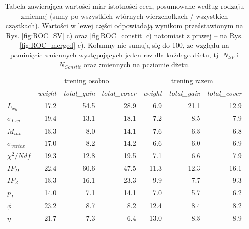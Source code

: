 \begin{table}
\centering
\begin{tabular}{l|rrr|rrr}
\toprule
{} & \multicolumn{3}{c|}{trening osobno} & \multicolumn{3}{c}{trening razem} \\
{} & \textit{weight} & \textit{total\_gain} & \textit{total\_cover} & \textit{weight} &   \textit{total\_gain} &  \textit{total\_cover} \\
\midrule
$L_{xy}$              &     17.2 &         54.5 &          28.9 &    6.9 &       21.1 &        12.9 \\
$\sigma_{Lxy}$         &     19.4 &         13.1 &          18.1 &    7.2 &        8.5 &         7.9 \\
$M_{inv}$             &     18.3 &          8.0 &          14.1 &    7.6 &        6.8 &         6.8 \\
$\sigma_{vertex}$       &     17.0 &          8.2 &          14.2 &    6.6 &        6.0 &         6.9 \\
$\chi^2/Ndf$             &     19.3 &         12.8 &          19.5 &    7.1 &        6.6 &         7.9 \\
\cline{1-4}
$IP_D$ &     22.4 &         60.6 &          47.5 &   11.3 &       12.3 &        16.1 \\
$IP_Z$ &     18.3 &         16.1 &          23.3 &    9.9 &        7.7 &         9.3 \\
$p_T$               &     14.0 &          7.1 &          14.1 &    7.0 &        5.7 &         6.2 \\
$\phi$              &     23.2 &          8.7 &           8.2 &   12.4 &        8.4 &         8.2 \\
$\eta$              &     21.7 &          7.3 &           6.4 &   13.0 &        8.8 &         8.9 \\
\bottomrule
\end{tabular}
\caption{Tabela zawierająca wartości miar istotności cech, posumowane według rodzaju zmiennej (sumy po wszystkich wtórnych wierzchołkach / wszystkich cząstkach). 
Wartości w lewej części odpowiadają wynikom przedstawionym na Rys. \ref{fig:ROC_SV} c) oraz \ref{fig:ROC_constit} c) natomiast z prawej -- na Rys. \ref{fig:ROC_merged} c).
Kolumny nie sumują się do 100, ze względu na pominięcie zmiennych występujących jeden raz dla każdego dżetu, tj. $N_{SV}$ i  $N_{Constit}$ oraz zmiennych na poziomie dżetu.}
\label{tab:feat_imp_by_name}
\end{table}



